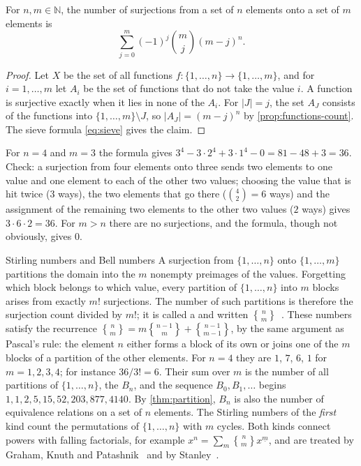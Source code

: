 \begin{proposition}
\label{prop:surjections}
For $n,m\in\mathbb N$, the number of surjections from a set of $n$ elements onto a set of $m$ elements is
\[
\sum_{j=0}^{m}(-1)^j\binom mj(m-j)^n .
\]
\end{proposition}

\begin{proof}
Let $X$ be the set of all functions $f\colon\{1,\ldots,n\}\to\{1,\ldots,m\}$, and for $i=1,\ldots,m$ let $A_i$ be the set of functions that do not take the value $i$. A function is surjective exactly when it lies in none of the $A_i$. For $|J|=j$, the set $A_J$ consists of the functions into $\{1,\ldots,m\}\setminus J$, so $|A_J|=(m-j)^n$ by \cref{prop:functions-count}. The sieve formula \eqref{eq:sieve} gives the claim.
\end{proof}

For $n=4$ and $m=3$ the formula gives $3^4-3\cdot2^4+3\cdot1^4-0=81-48+3=36$. Check: a surjection from four elements onto three sends two elements to one value and one element to each of the other two values; choosing the value that is hit twice ($3$ ways), the two elements that go there ($\binom42=6$ ways) and the assignment of the remaining two elements to the other two values ($2$ ways) gives $3\cdot6\cdot2=36$. For $m>n$ there are no surjections, and the formula, though not obviously, gives $0$.

\begin{note}{Stirling numbers and Bell numbers}
A surjection from $\{1,\ldots,n\}$ onto $\{1,\ldots,m\}$ partitions the domain into the $m$ nonempty preimages of the values. Forgetting which block belongs to which value, every partition of $\{1,\ldots,n\}$ into $m$ blocks arises from exactly $m!$ surjections. The number of such partitions is therefore the surjection count divided by $m!$; it is called a  and written $\genfrac\{\}{0pt}{}{n}{m}$~\cite[Sect.~6.1]{graham1994concrete}. These numbers satisfy the recurrence $\genfrac\{\}{0pt}{}{n}{m}=m\genfrac\{\}{0pt}{}{n-1}{m}+\genfrac\{\}{0pt}{}{n-1}{m-1}$, by the same argument as Pascal's rule: the element $n$ either forms a block of its own or joins one of the $m$ blocks of a partition of the other elements. For $n=4$ they are $1$, $7$, $6$, $1$ for $m=1,2,3,4$; for instance $36/3!=6$. Their sum over $m$ is the number of all partitions of $\{1,\ldots,n\}$, the  $B_n$, and the sequence $B_0,B_1,\ldots$ begins $1,1,2,5,15,52,203,877,4140$. By \cref{thm:partition}, $B_n$ is also the number of equivalence relations on a set of $n$ elements. The Stirling numbers of the \emph{first} kind count the permutations of $\{1,\ldots,n\}$ with $m$ cycles. Both kinds connect powers with falling factorials, for example $x^n=\sum_m\genfrac\{\}{0pt}{}{n}{m}x^{\underline m}$, and are treated by Graham, Knuth and Patashnik~\cite[Sect.~6.1]{graham1994concrete} and by Stanley~\cite[Sects.~1.3 and~1.9]{stanley2012ec1}.
\end{note}

